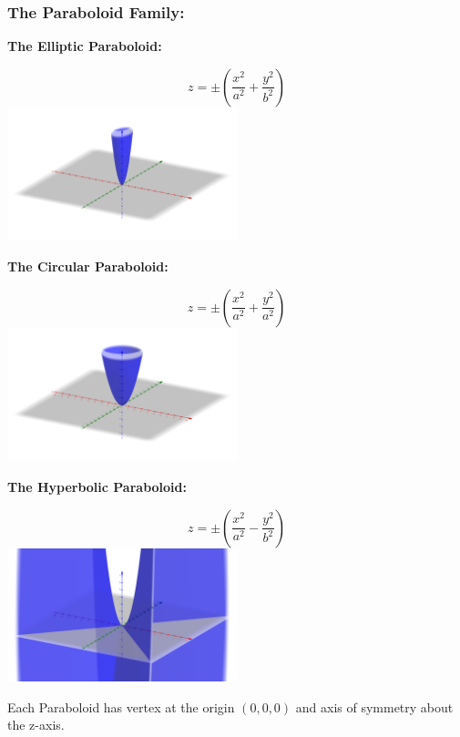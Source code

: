 \documentclass[14pt]{article}
\begin{document}
    \subsubsection{The Paraboloid Family:}
    \textbf{The Elliptic Paraboloid:}
    \begin{multicols}{2}
        \begin{equation}z=\pm\left(\frac{x^2}{a^2}+\frac{y^2}{b^2}\right)\end{equation}    
        \includegraphics[width=0.5\textwidth]{Elliptical_Paraboloid.png}
    \end{multicols}
    \textbf{The Circular Paraboloid:}
    \begin{multicols}{2}
        \begin{equation}z=\pm\left(\frac{x^2}{a^2}+\frac{y^2}{a^2}\right)\end{equation}
        \includegraphics[width=0.5\textwidth]{Paraboloid.png}
    \end{multicols}
    \textbf{The Hyperbolic Paraboloid:}
    \begin{multicols}{2}
        \begin{equation}z=\pm\left(\frac{x^2}{a^2}-\frac{y^2}{b^2}\right)\end{equation}
        \includegraphics[width=0.5\textwidth]{Hyperbolic_Paraboloid.png}
    \end{multicols}
    Each Paraboloid has vertex at the origin $(0,0,0)$ and axis of symmetry about the z-axis.
    \pagebreak
\end{document}
